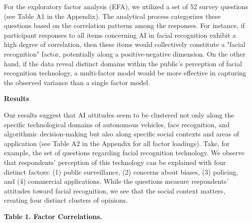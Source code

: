 For the exploratory factor analysis (EFA), we utilized a set of 52 survey questions (see Table A1 in the Appendix). The analytical process categorizes these questions based on the correlation patterns among the responses. For instance, if participant responses to all items concerning AI in facial recognition exhibit a high degree of correlation, then these items would collectively constitute a "facial recognition" factor, potentially along a positive-negative dimension. On the other hand, if the data reveal distinct domains within the public's perception of facial recognition technology, a multi-factor model would be more effective in capturing the observed variance than a single factor model.

\textbf{Results}

Our results suggest that AI attitudes seem to be clustered not only along the specific technological domains of autonomous vehicles, face recognition, and algorithmic decision-making but also along specific social contexts and areas of application (see Table A2 in the Appendix for all factor loadings). Take, for example, the set of questions regarding facial recognition technology. We observe that respondents' perception of this technology can be explained with four distinct factors: (1) public surveillance, (2) concerns about biases, (3) policing, and (4) commercial applications. While the questions measure respondents' attitudes toward facial recognition, we see that the social context matters, creating four distinct clusters of opinions.

\textbf{Table }\textbf{1}\textbf{. Factor Correlations.}

